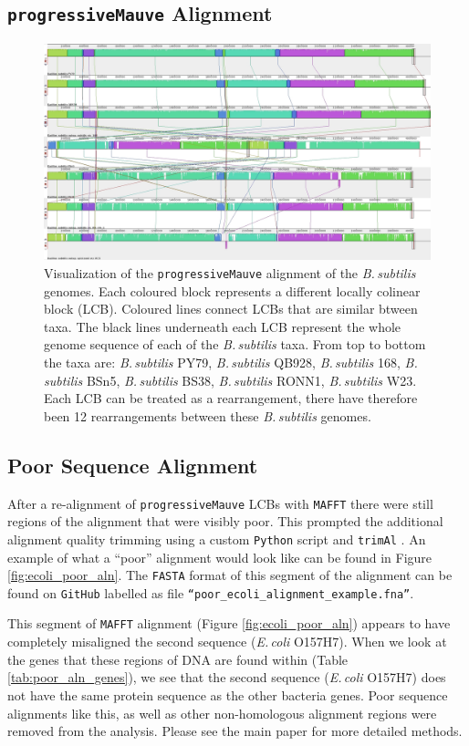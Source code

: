 \documentclass[11pt]{article}
\newcommand{\ecol}{\textit{E.\,coli}\xspace}
\newcommand{\bass}{\textit{B.\,subtilis}\xspace}
\newcommand{\p}{\texttt{progressiveMauve}\xspace}
\begin{document}
	
	\subsection{\p Alignment}
	\begin{figure}[H]
		\begin{center}
			\includegraphics[width=\textwidth]{./figs/Bacillus_alignment_mauve.jpg}
			\caption{\label{fig:mauvealn} Visualization of the \p alignment of the \bass genomes. Each coloured block represents a different locally colinear block (LCB). Coloured lines connect LCBs that are similar btween taxa. The black lines underneath each LCB represent the whole genome sequence of each of the \bass taxa. From top to bottom the taxa are: \bass PY79, \bass QB928, \bass 168, \bass BSn5, \bass BS38, \bass RONN1, \bass W23.  Each LCB can be treated as a rearrangement, there have therefore been 12 rearrangements between these \bass genomes.}
		\end{center}
	\end{figure}

\subsection{Poor Sequence Alignment}
After a re-alignment of \p LCBs with \texttt{MAFFT} there were still regions of the alignment that were visibly poor.
This prompted the additional alignment quality trimming using a custom \texttt{Python} script and \texttt{trimAl} \citep{capella2009trimal}.
An example of what a ``poor'' alignment would look like can be found in Figure \ref{fig:ecoli_poor_aln}.
The \texttt{FASTA} format of this segment of the alignment can be found on \texttt{GitHub} labelled as file \texttt{``poor\_ecoli\_alignment\_example.fna''}.

This segment of \texttt{MAFFT} alignment (Figure \ref{fig:ecoli_poor_aln}) appears to have completely misaligned the second sequence (\ecol O157H7).
When we look at the genes that these regions of DNA are found within (Table \ref{tab:poor_aln_genes}), we see that the second sequence (\ecol O157H7) does not have the same protein sequence as the other bacteria genes.
Poor sequence alignments like this, as well as other non-homologous alignment regions were removed from the analysis.
Please see the main paper for more detailed methods.
\end{document}
